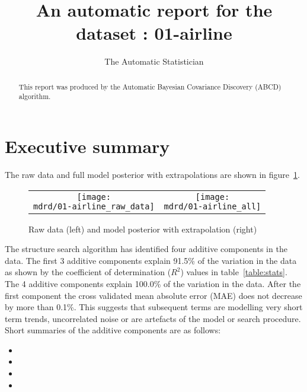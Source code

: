 \documentclass{article} %
\title{An automatic report for the dataset : 01-airline}
\author{
The Automatic Statistician
}
\begin{document}
\allowdisplaybreaks

\maketitle

\begin{abstract}
This report was produced by the Automatic Bayesian Covariance Discovery (ABCD) algorithm.
\end{abstract}

\section{Executive summary}

The raw data and full model posterior with extrapolations are shown in figure~\ref{fig:rawandfit}.

\begin{figure}[H]
\newcommand{\wmgd}{0.5\columnwidth}
\newcommand{\hmgd}{3.0cm}
\newcommand{\mdrd}{01-airline}
\newcommand{\mbm}{\hspace{-0.3cm}}
\begin{tabular}{cc}
\mbm \texttt{[image: \\mdrd/01-airline\_raw\_data]} & \texttt{[image: \\mdrd/01-airline\_all]}
\end{tabular}
\caption{Raw data (left) and model posterior with extrapolation (right)}
\label{fig:rawandfit}
\end{figure}

The structure search algorithm has identified four additive components in the data.
The  first 3 additive components explain 91.5\% of the variation in the data as shown by the coefficient of determination ($R^2$) values in table~\ref{table:stats}.
The 4 additive components explain 100.0\% of the variation in the data.
After the first component the cross validated mean absolute error (MAE) does not decrease by more than 0.1\%.
This suggests that subsequent terms are modelling very short term trends, uncorrelated noise or are artefacts of the model or search procedure.
Short summaries of the additive components are as follows:
\begin{itemize}

  \item  

  \item  

  \item  

  \item  

\end{itemize}
\end{document}
